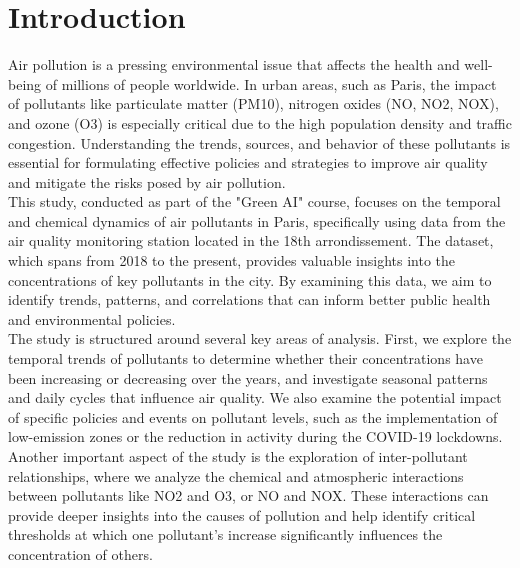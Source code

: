 \documentclass{modeleRapport}
\begin{document}
\fairepagedegarde
\fairetabledesmatieres

\section{Introduction}

Air pollution is a pressing environmental issue that affects the health and well-being of millions of people worldwide. In 
urban areas, such as Paris, the impact of pollutants like particulate matter (PM10), nitrogen oxides (NO, NO2, NOX), 
and ozone (O3) is especially critical due to the high population density and traffic congestion. Understanding the trends, 
sources, and behavior of these pollutants is essential for formulating effective policies and strategies to improve air quality 
and mitigate the risks posed by air pollution.\\

This study, conducted as part of the "Green AI" course, focuses on the temporal and chemical dynamics of air pollutants 
in Paris, specifically using data from the air quality monitoring station located in the 18th arrondissement. The dataset, 
which spans from 2018 to the present, provides valuable insights into the concentrations of key pollutants in the city. 
By examining this data, we aim to identify trends, patterns, and correlations that can inform better public health 
and environmental policies.\\

The study is structured around several key areas of analysis. First, we explore the temporal trends of pollutants to 
determine whether their concentrations have been increasing or decreasing over the years, and investigate seasonal 
patterns and daily cycles that influence air quality. We also examine the potential impact of specific policies and events 
on pollutant levels, such as the implementation of low-emission zones or the reduction in activity during the COVID-19 
lockdowns.\\

Another important aspect of the study is the exploration of inter-pollutant relationships, where we analyze the chemical 
and atmospheric interactions between pollutants like NO2 and O3, or NO and NOX. These interactions can provide deeper 
insights into the causes of pollution and help identify critical thresholds at which one pollutant’s increase significantly 
influences the concentration of others.\\
\end{document}
